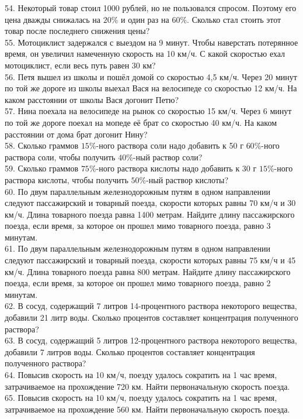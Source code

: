 \documentclass[12pt]{article}
\begin{document}
54. Некоторый товар стоил 1000 рублей, но не пользовался спросом. Поэтому его цена дважды снижалась на $20\%$ и один раз на $60\%.$ Сколько стал стоить этот товар после последнего снижения цены?\\
55. Мотоциклист задержался с выездом на 9 минут. Чтобы наверстать потерянное время, он увеличил намеченную скорость на 10 км/ч. С какой скоростью ехал мотоциклист, если весь путь равен 30 км?\\
56. Петя вышел из школы и пошёл домой со скоростью 4,5 км/ч. Через 20 минут по той же дороге из школы выехал Вася на велосипеде со скоростью 12 км/ч. На каком расстоянии от школы Вася догонит Петю?\\
57. Нина поехала на велосипеде на рынок со скоростью 15 км/ч. Через 6 минут по той же дороге поехал на мопеде её брат со скоростью 40 км/ч. На каком расстоянии от дома брат догонит Нину?\\
58. Сколько граммов $15\%$-ного раствора соли надо добавить к 50 г $60\%$-ного раствора соли, чтобы получить $40\%$-ный раствор соли?\\
59. Сколько граммов $75\%$-ного раствора кислоты надо добавить к 30 г $15\%$-ного раствора кислоты, чтобы получить $50\%$-ный раствор кислоты?\\
60. По двум параллельным железнодорожным путям в одном направлении следуют пассажирский и товарный поезда, скорости которых равны 70 км/ч и 30 км/ч. Длина товарного поезда равна 1400 метрам. Найдите длину пассажирского поезда, если время, за которое он прошел мимо товарного поезда, равно 3 минутам.\\
61. По двум параллельным железнодорожным путям в одном направлении следуют пассажирский и товарный поезда, скорости которых равны 75 км/ч и 45 км/ч. Длина товарного поезда равна 800 метрам. Найдите длину пассажирского поезда, если время, за которое он прошел мимо товарного поезда, равно 2 минутам.\\
62. В сосуд, содержащий 7 литров 14-процентного раствора некоторого вещества, добавили 21 литр воды. Сколько процентов составляет концентрация полученного раствора?\\
63. В сосуд, содержащий 5 литров 12-процентного раствора некоторого вещества, добавили 7 литров воды. Сколько процентов составляет концентрация полученного раствора?\\
64. Повысив скорость на 10 км/ч, поезду удалось сократить на 1 час время, затрачиваемое на прохождение 720 км. Найти первоначальную скорость поезда.\\
65. Повысив скорость на 10 км/ч, поезду удалось сократить на 1 час время, затрачиваемое на прохождение 560 км. Найти первоначальную скорость поезда.\\
\end{document}
